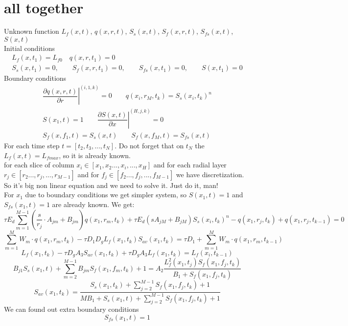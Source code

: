 \documentclass[12pt]{article}
\begin{document}
\section{all together}
Unknown function $L_f(x, t)$, $q(x, r, t)$, $S_s(x,t)$, $S_f(x, r, t)$, $S_{fs}(x,t)$, $S(x,t)$\\
Initial conditions
\begin{equation}
	\begin{array}{c}
	L_f(x, t_1) = L_{f0} \quad q(x, r, t_1) = 0\\
	S_s(x,t_1) = 0, \qquad S_f(x, r, t_1) = 0,\qquad S_{fs}(x,t_1) = 0,\qquad S(x,t_1) = 0
	\end{array}
\end{equation}
Boundary conditions
\begin{equation}
\begin{array}{c}
\left.\dfrac{\partial q(x,r,t)}{\partial r}\right\vert^{(i, 1, k)}=0 \qquad q(x_i, r_M, t_k) = S_s(x_i, t_k)^n\\
S(x_1, t) = 1 \qquad \left.\dfrac{\partial S(x,t)}{\partial x}\right\vert^{(H, j, k)}=0\\
S_f(x,f_1,t) = S_s(x, t) \qquad S_f(x,f_M,t) = S_{fs}(x, t)
\end{array}
\end{equation}
For each time step $t = [t_2, t_3, ..., t_N]$. Do not forget that on $t_N$ the $L_f(x,t)=L_{fmax}$, so it is already known.\\	
for each slice of column $x_i \in [x_1, x_2 ..., x_i, ..., x_H]$ and for each radial layer  $r_j \in [r_2 ..., r_j, ..., r_{M-1}]$ and for $f_j \in [f_2 ..., f_j, ..., f_{M-1}]$ we have discretization. So it's big non linear equation and we need to solve it. Just do it, man!\\
For $x_1$ due to boundary conditions we get simpler system, so $S(x_1, t)=1$ and $S_{fs}(x_1, t)=1$ are already known. We get:
\begin{equation}
\tau E_d\sum_{m=1}^{M-1} \left(\dfrac{s}{r_j} \cdot A_{jm} + B_{jm} \right) q(x_1,r_m,t_{k})  +\tau E_d\left(sA_{jM} + B_{jM} \right)S_s(x_i, t_k)^n - q(x_1,r_j,t_{k}) + q(x_1,r_j,t_{k-1})  = 0
\end{equation}
\begin{equation}
\sum_{m=1}^{M} W_m \cdot q(x_1,r_m,t_k)-\tau D_1D_gL_f(x_1,t_k)S_{av}(x_1, t_k) =
\tau D_1 + \sum_{m=1}^{M} W_m \cdot q(x_1,r_m,t_{k-1})
\end{equation}
\begin{equation}
L_f(x_1,t_k)-\tau D_gA_3S_{av}(x_1, t_k)+\tau D_gA_3L_f{(x_1,t_k)}=
L_f(x_i,t_{k-1})
\end{equation}
\begin{equation}
B_{j1}S_s(x_1, t) + \sum_{m=2}^{M-1}B_{jm}S_f(x_1,f_m,t_k)+1=
A_2\frac{L_f^2(x_1,t_j)S_f(x_1,f_j,t_k)}{B_1+S_f(x_1,f_j,t_k)}
\end{equation}
\begin{equation}
S_{av}(x_1,t_k) = 
\frac{S_s(x_1, t_k)+\sum_{j=2}^{M-1}S_f(x_1, f_j, t_k)+1}{MB_1+S_s(x_1, t)+\sum_{j=2}^{M-1}S_f(x_1, f_j,t_k)+1}
\end{equation}
We can found out extra boundary conditions
\begin{equation}
S_{fs}(x_1, t) = 1
\end{equation}
\end{document}
